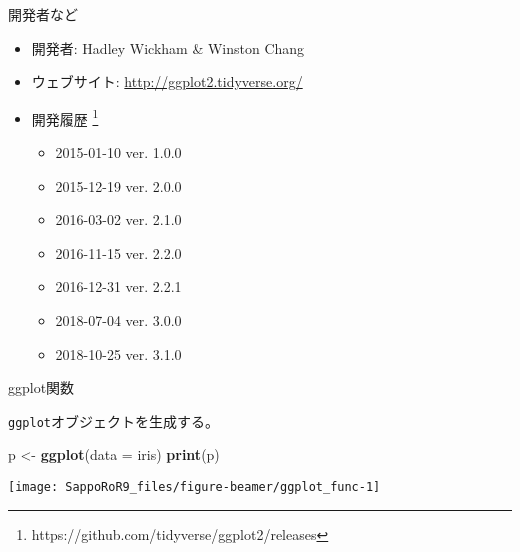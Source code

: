 \documentclass[ignorenonframetext,]{beamer}
\newenvironment{Shaded}{\begin{snugshade}}{\end{snugshade}}
\newcommand{\KeywordTok}[1]{\textcolor[rgb]{0.13,0.29,0.53}{\textbf{#1}}}
\newcommand{\DataTypeTok}[1]{\textcolor[rgb]{0.13,0.29,0.53}{#1}}
\newcommand{\StringTok}[1]{\textcolor[rgb]{0.31,0.60,0.02}{#1}}
\newcommand{\NormalTok}[1]{#1}
\providecommand{\tightlist}{%
  \setlength{\itemsep}{0pt}\setlength{\parskip}{0pt}}
\let\oldShaded\Shaded
\let\endoldShaded\endShaded
\renewenvironment{Shaded}{\footnotesize\oldShaded}{\endoldShaded}
\begin{document}
\begin{frame}{開発者など}

\begin{itemize}
\tightlist
\item
  開発者: Hadley Wickham \& Winston Chang
\item
  ウェブサイト: \url{http://ggplot2.tidyverse.org/}
\item
  開発履歴 \footnote{https://github.com/tidyverse/ggplot2/releases}

  \begin{itemize}
  \tightlist
  \item
    2015-01-10 ver. 1.0.0
  \item
    2015-12-19 ver. 2.0.0
  \item
    2016-03-02 ver. 2.1.0
  \item
    2016-11-15 ver. 2.2.0
  \item
    2016-12-31 ver. 2.2.1
  \item
    2018-07-04 ver. 3.0.0
  \item
    2018-10-25 ver. 3.1.0
  \end{itemize}
\end{itemize}

\end{frame}

\begin{frame}[fragile]{ggplot関数}

\texttt{ggplot}オブジェクトを生成する。

\begin{Shaded}
\begin{Highlighting}[]
\NormalTok{p <-}\StringTok{ }\KeywordTok{ggplot}\NormalTok{(}\DataTypeTok{data =}\NormalTok{ iris)}
\KeywordTok{print}\NormalTok{(p)}
\end{Highlighting}
\end{Shaded}

\texttt{[image: SappoRoR9\_files/figure-beamer/ggplot\_func-1]}

\end{frame}
\end{document}

